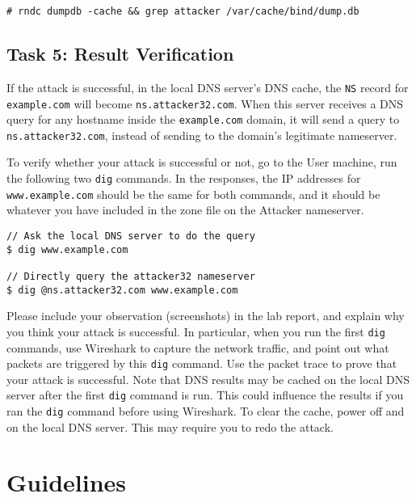 \begin{lstlisting}
# rndc dumpdb -cache && grep attacker /var/cache/bind/dump.db
\end{lstlisting}
 

\subsection{Task 5: Result Verification}

If the attack is successful, in the local DNS server's DNS cache, 
the {\tt NS} record for \texttt{example.com} will become 
\texttt{ns.attacker32.com}.
When this server receives a DNS query for any hostname
inside the \texttt{example.com} domain,  it will
send a query to \texttt{ns.attacker32.com}, instead of 
sending to the domain's legitimate nameserver. 


To verify whether your attack is successful or not, 
go to the User machine, run the following two
\texttt{dig} commands. In the responses, the IP addresses for 
\texttt{www.example.com} should be the same for both 
commands, and it should be whatever you have included
in the zone file on the Attacker nameserver. 

\begin{lstlisting}
// Ask the local DNS server to do the query
$ dig www.example.com

// Directly query the attacker32 nameserver
$ dig @ns.attacker32.com www.example.com
\end{lstlisting}
 
Please include your observation (screenshots) in the lab 
report, and explain why you think your attack is successful. 
In particular, when you run the first \texttt{dig} commands,
use Wireshark to capture the network traffic, and 
point out what packets are triggered by this
\texttt{dig} command. Use the packet trace to 
prove that your attack is successful. Note that DNS results
may be cached on the local DNS server after the first
\texttt{dig} command is run. This could influence the
results if you ran the \texttt{dig} command before using
Wireshark. To clear the cache, power off and on the local 
DNS server. This may require you to redo the attack.




\section{Guidelines} 

